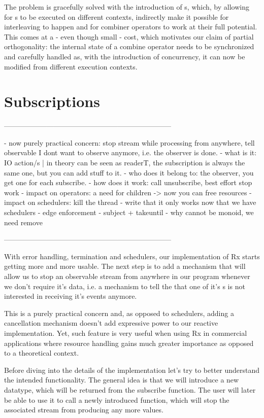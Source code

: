 The problem is gracefully solved with the introduction of s, which, by allowing for s to be executed on different contexts, indirectly make it possible for interleaving to happen and for combiner operators to work at their full potential. This comes at a - even though small - cost, which motivates our claim of partial orthogonality: the internal state of a combine operator needs to be synchronized and carefully handled as, with the introduction of concurrency, it can now be modified from different execution contexts.

\section{Subscriptions}
\label{sec:subscriptions}

-----------------------------------------------------------------------

- now purely practical concern: stop stream while processing from anywhere, tell observable I dont want to observe anymore, i.e. the observer is done.
- what is it: IO action/s | in theory can be seen as readerT, the subscription is always the same one, but you can add stuff to it. 
- who does it belong to: the observer, you get one for each subscribe.
- how does it work: call unsubscribe, best effort stop work
- impact on operators: a need for children -> now you can free resources 
- impact on schedulers: kill the thread
- write that it only works now that we have schedulers
- edge enforcement
- subject + takeuntil
- why cannot be monoid, we need remove

-----------------------------------------------------------------------

With error handling, termination and schedulers, our implementation of Rx starts getting more and more usable. The next step is to add a mechanism that will allow us to stop an observable stream from anywhere in our program whenever we don't require it's data, i.e. a mechanism to tell the  that one of it's s is not interested in receiving it's events anymore. 

This is a purely practical concern and, as opposed to schedulers, adding a cancellation mechanism doesn't add expressive power to our reactive implementation. Yet, such feature is very useful when using Rx in commercial applications where resource handling gains much greater importance as opposed to a theoretical context.

Before diving into the details of the implementation let's try to better understand the intended functionality. The general idea is that we will introduce a new datatype,  which will be returned from the subscribe function. The user will later be able to use it to call a newly introduced function,  which will stop the associated stream from producing any more values.

